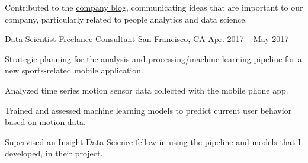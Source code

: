 \begin{cventries}
{\begin{cvitems}
        \item {Contributed to the {\href{https://medium.com/ansaro-blog}{company blog}}, communicating ideas that are important to our company, particularly related to people analytics and data science.}
     \end{cvitems}
    }

  \cventry
    {Data Scientist} %
    {Freelance Consultant} %
    {San Francisco, CA} %
    {Apr. 2017 -- May 2017} %
    {
      \begin{cvitems} %
        \item {Strategic planning for the analysis and processing/machine learning pipeline for a new sports-related mobile application.} %
        \item {Analyzed time series motion sensor data collected with the mobile phone app.}
        \item {Trained and assessed machine learning models to predict current user behavior based on motion data.}
        \item {Supervised an Insight Data Science fellow in using the pipeline and models that I developed, in their project.} %
     \end{cvitems}
    }


\end{cventries}

